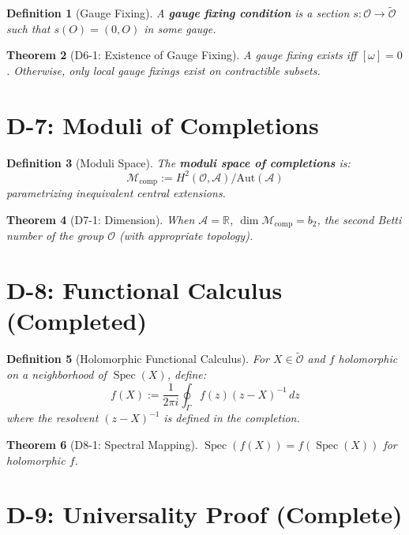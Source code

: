\documentclass[12pt, oneside]{article}
\newtheorem{theorem}{Theorem}[section]
\newtheorem{definition}[theorem]{Definition}
\DeclareMathOperator{\Spec}{Spec}
\newcommand{\A}{\mathcal{A}}
\newcommand{\Opr}{\mathcal{O}}
\newcommand{\wtilde}{\widetilde}
\begin{document}
\begin{definition}[Gauge Fixing]
A \textbf{gauge fixing condition} is a section $s: \Opr \rightarrow \wtilde{\Opr}$ such that $s(O) = (0, O)$ in some gauge.
\end{definition}

\begin{theorem}[D6-1: Existence of Gauge Fixing]
A gauge fixing exists iff $[\omega] = 0$. Otherwise, only local gauge fixings exist on contractible subsets.
\end{theorem}

\section{D-7: Moduli of Completions}

\begin{definition}[Moduli Space]
The \textbf{moduli space of completions} is:
\begin{equation}
\mathcal{M}_{\text{comp}} := H^2(\Opr, \A) / \text{Aut}(\A)
\end{equation}
parametrizing inequivalent central extensions.
\end{definition}

\begin{theorem}[D7-1: Dimension]
When $\A = \mathbb{R}$, $\dim \mathcal{M}_{\text{comp}} = b_2$, the second Betti number of the group $\Opr$ (with appropriate topology).
\end{theorem}

\section{D-8: Functional Calculus (Completed)}

\begin{definition}[Holomorphic Functional Calculus]
For $X \in \wtilde{\Opr}$ and $f$ holomorphic on a neighborhood of $\Spec(X)$, define:
\begin{equation}
f(X) := \frac{1}{2\pi i} \oint_\Gamma f(z) (z - X)^{-1} \, dz
\end{equation}
where the resolvent $(z - X)^{-1}$ is defined in the completion.
\end{definition}

\begin{theorem}[D8-1: Spectral Mapping]
$\Spec(f(X)) = f(\Spec(X))$ for holomorphic $f$.
\end{theorem}

\section{D-9: Universality Proof (Complete)}
\end{document}
